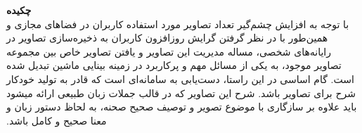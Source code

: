 \textbf{چکیده}\\
‫با توجه به افزایش چشم‌گیر تعداد تصاویر مورد استفاده کاربران در فضاهای مجازی و همین‌طور با در نظر گرفتن گرایش روزافزون کاربران به ذخیره‌سازی تصاویر در رایانه‌های شخصی، مساله مدیریت این تصاویر و یافتن تصاویر خاص بین مجموعه تصاویر موجود، به یکی از مسائل مهم و پرکاربرد در زمینه بینایی ماشین تبدیل شده‌ است. گام اساسی در این راستا، دست‌یابی به سامانه‌ای است که قادر به تولید خودکار شرح برای تصاویر باشد. شرح این تصاویر که در قالب جملات زبان طبیعی ارائه می­شود باید علاوه بر سازگاری با موضوع تصویر و توصیف صحیح صحنه، به لحاظ دستور زبان و معنا صحیح و کامل باشد. 